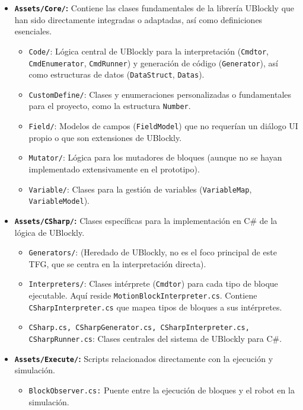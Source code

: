 \begin{itemize}
	\item \textbf{\texttt{Assets/Core/}:} Contiene las clases fundamentales de la librería UBlockly que han sido directamente integradas o adaptadas, así como definiciones esenciales.
	\begin{itemize}
		\item \texttt{Code/}: Lógica central de UBlockly para la interpretación (\texttt{Cmdtor}, \texttt{CmdEnumerator}, \texttt{CmdRunner}) y generación de código (\texttt{Generator}), así como estructuras de datos (\texttt{DataStruct}, \texttt{Datas}).
		\item \texttt{CustomDefine/}: Clases y enumeraciones personalizadas o fundamentales para el proyecto, como la estructura \texttt{Number}.
		\item \texttt{Field/}: Modelos de campos (\texttt{FieldModel}) que no requerían un diálogo UI propio o que son extensiones de UBlockly.
		\item \texttt{Mutator/}: Lógica para los mutadores de bloques (aunque no se hayan implementado extensivamente en el prototipo).
		\item \texttt{Variable/}: Clases para la gestión de variables (\texttt{VariableMap}, \texttt{VariableModel}).
	\end{itemize}
	\item \textbf{\texttt{Assets/CSharp/}:} Clases específicas para la implementación en C\# de la lógica de UBlockly.
	\begin{itemize}
		\item \texttt{Generators/}: (Heredado de UBlockly, no es el foco principal de este TFG, que se centra en la interpretación directa).
		\item \texttt{Interpreters/}: Clases intérprete (\texttt{Cmdtor}) para cada tipo de bloque ejecutable. Aquí reside \texttt{MotionBlockInterpreter.cs}. Contiene \texttt{CSharpInterpreter.cs} que mapea tipos de bloques a sus intérpretes.
		\item \texttt{CSharp.cs, CSharpGenerator.cs, CSharpInterpreter.cs, CSharpRunner.cs}: Clases centrales del sistema de UBlockly para C\#.
	\end{itemize}
	\item \textbf{\texttt{Assets/Execute/}:} Scripts relacionados directamente con la ejecución y simulación.
	\begin{itemize}
		\item \texttt{BlockObserver.cs:} Puente entre la ejecución de bloques y el robot en la simulación.

\end{itemize}
\end{itemize}
